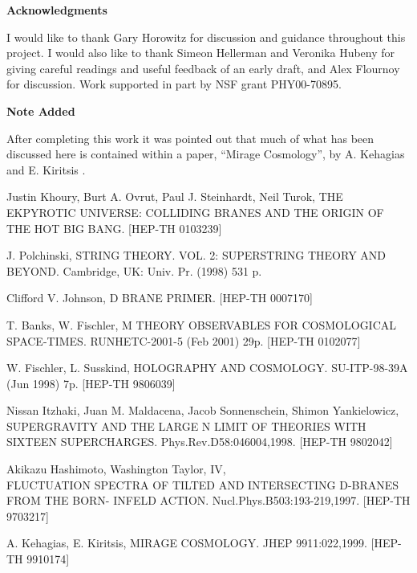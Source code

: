 \documentclass[a4paper,12pt]{article}
\begin{document}
\vskip 1.25cm \centerline{\bf Acknowledgments} \vskip 1cm

I would like to thank Gary Horowitz for discussion and guidance
throughout this project.  I would also like to thank Simeon Hellerman and
Veronika Hubeny for giving careful readings and useful feedback of an
early draft, and Alex Flournoy for discussion.
Work supported in part by NSF grant PHY00-70895.

\vskip 1.25cm \centerline{\bf \large Note Added \normalsize} 
\vskip 1cm

After completing this work it was pointed out that much of what has
been discussed here is contained within a paper, ``Mirage Cosmology'',
by A. Kehagias and E. Kiritsis \cite{mirage}.

\pagebreak

\begin{thebibliography}{99}

    Justin Khoury, Burt A. Ovrut, Paul J. Steinhardt, Neil
    Turok, THE EKPYROTIC UNIVERSE: COLLIDING BRANES AND THE
    ORIGIN OF THE HOT BIG BANG.
    [HEP-TH 0103239]

    J. Polchinski, STRING THEORY. VOL. 2: SUPERSTRING THEORY
    AND BEYOND.
    Cambridge, UK: Univ. Pr. (1998) 531 p.

    Clifford V. Johnson, D BRANE PRIMER.
    [HEP-TH 0007170]

    T. Banks, W. Fischler, M THEORY OBSERVABLES FOR
    COSMOLOGICAL SPACE-TIMES. RUNHETC-2001-5 (Feb 2001) 29p.
    [HEP-TH 0102077]

    W. Fischler, L. Susskind, HOLOGRAPHY AND COSMOLOGY.
    SU-ITP-98-39A (Jun 1998) 7p.
    [HEP-TH 9806039]

    Nissan Itzhaki, Juan M. Maldacena, Jacob Sonnenschein,
    Shimon Yankielowicz, SUPERGRAVITY AND THE LARGE N LIMIT OF
    THEORIES WITH SIXTEEN SUPERCHARGES.
    Phys.Rev.D58:046004,1998.
    [HEP-TH 9802042]

    Akikazu Hashimoto, Washington Taylor, IV, \\
    FLUCTUATION SPECTRA OF TILTED AND INTERSECTING D-BRANES FROM THE BORN-
    INFELD ACTION.
    Nucl.Phys.B503:193-219,1997.
    [HEP-TH 9703217]

    A. Kehagias, E. Kiritsis, MIRAGE COSMOLOGY.
    JHEP 9911:022,1999.
    [HEP-TH 9910174]

\end{thebibliography}
\end{document}
